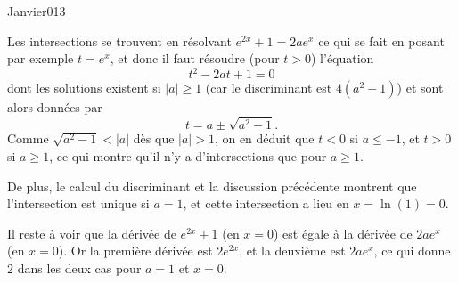 \begin{corrige}{Janvier013}



Les intersections se trouvent en résolvant $e^{2x} + 1 = 2 a e^x$ ce
qui se fait en posant par exemple $t = e^x$, et donc il faut résoudre
(pour $t > 0$) l'équation
\begin{equation*}
  t^2  - 2 a t + 1 = 0
\end{equation*}
dont les solutions existent si $| a |\geq 1$ (car le discriminant
est $4(a^2 -1)$) et sont alors données par
\begin{equation*}
  t = a \pm \sqrt{a^2-1}.
\end{equation*}
Comme $\sqrt{a^2 - 1} <  |a|$ dès que $|a| > 1$, on en déduit
que $t < 0$ si $a \leq -1$, et $t > 0$ si $a \geq 1$, ce qui montre
qu'il n'y a d'intersections que pour $a \geq 1$.

De plus, le calcul du discriminant et la discussion précédente
montrent que l'intersection est unique si $a = 1$, et cette
intersection a lieu en $x = \ln(1) = 0$.

Il reste à voir que la dérivée de $e^{2x} + 1$ (en $x = 0$) est égale
à la dérivée de $2 a e^x$ (en $x = 0$). Or la première dérivée est $2
e^{2x}$, et la deuxième est $2 a e^x$, ce qui donne $2$ dans les deux
cas pour $a = 1$ et $x = 0$.


\end{corrige}
